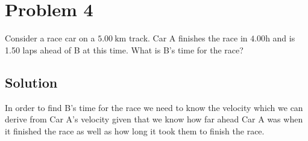 \documentclass{article}
\newcommand{\kilo}{\text{k}}
\newcommand{\meter}{\text{m}}
\begin{document}
\section*{Problem 4}
Consider a race car on a $5.00\ \unit{\kilo\meter}$ track. Car A finishes the race in $4.00 \unit{\hour}$ and is 1.50 laps ahead of B at this time. What is B's time for the race?

\subsection*{Solution}
In order to find B's time for the race we need to know the velocity which we can derive from Car A's velocity given that we know how far ahead Car A was when it finished the race as well as how long it took them to finish the race.
\end{document}
